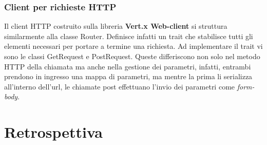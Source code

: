 	\subsubsection{Client per richieste HTTP}
	  Il client HTTP costruito sulla libreria \textbf{Vert.x Web-client} si struttura similarmente alla classe Router. Definisce infatti un trait che stabilisce tutti gli elementi necessari per portare a termine una richiesta. 
	  Ad implementare il trait vi sono le classi GetRequest e PostRequest. Queste differiscono non solo nel metodo HTTP della chiamata ma anche nella gestione dei parametri, infatti, entrambi prendono in ingresso una mappa di parametri, ma mentre la prima li serializza all'interno dell'url, le chiamate post effettuano l'invio dei parametri come \textit{form-body}.
      \clearpage
        
    \section{Retrospettiva}\label{sec:retrospective}


